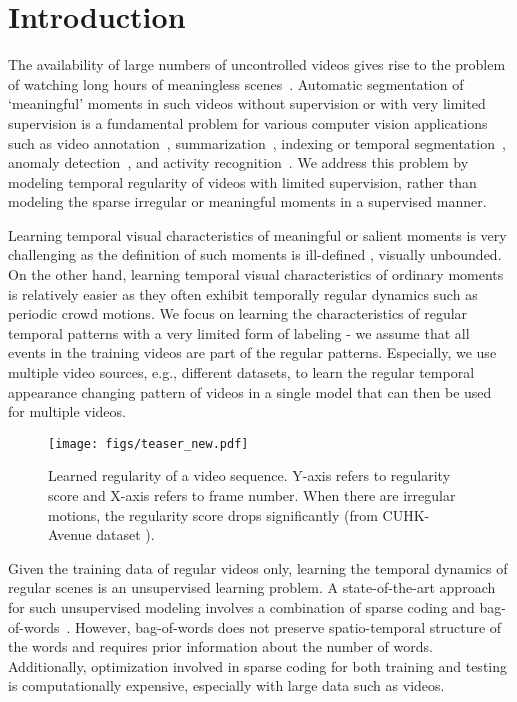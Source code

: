 \documentclass[10pt,twocolumn,letterpaper]{article}
\begin{document}
\section{Introduction}
\label{sec:intro}

The availability of large numbers of uncontrolled videos gives rise to the problem of watching long hours of meaningless scenes~\cite{sunFS14}. 
Automatic segmentation of `meaningful' moments in such videos without supervision or with very limited supervision is a fundamental problem for various computer vision applications such as video annotation~\cite{vondrick2013efficiently}, summarization~\cite{songVSJ15,chuSJ15}, indexing or temporal segmentation~\cite{laptevMSR08}, anomaly detection~\cite{popoola2012video}, and activity recognition~\cite{karpathyTSLSF14}.
We address this problem by modeling temporal regularity of videos with limited supervision, rather than modeling the sparse irregular or meaningful moments in a supervised manner. 

Learning temporal visual characteristics of meaningful or salient moments is very challenging as the definition of such moments is ill-defined \ie, visually unbounded. 
On the other hand, learning temporal visual characteristics of ordinary moments is relatively easier as they often exhibit temporally regular dynamics such as periodic crowd motions.
We focus on learning the characteristics of regular temporal patterns with a very limited form of labeling - we assume that all events in the training videos are part of the regular patterns. 
Especially, we use multiple video sources, e.g., different datasets, to learn the regular temporal appearance changing pattern of videos in a single model that can then be used for multiple videos.



\begin{figure}[t]
	\centering
	\texttt{[image: figs/teaser\_new.pdf]}
\caption{Learned regularity of a video sequence. Y-axis refers to regularity score and X-axis refers to frame number. When there are irregular motions, the regularity score drops significantly (from CUHK-Avenue dataset \cite{lu2013abnormal}).}
	\vspace{-6mm}
	\label{fig:teaser_new}
\end{figure}







Given the training data of regular videos only, learning the temporal dynamics of regular scenes is an unsupervised learning problem. A state-of-the-art approach for such unsupervised modeling involves a combination of sparse coding and bag-of-words~\cite{zhao2011online,congYL11,lu2013abnormal}.
However, bag-of-words does not preserve spatio-temporal structure of the words and requires prior information about the number of words. Additionally, optimization involved in sparse coding for both training and testing is computationally expensive, especially with large data such as videos.
\end{document}
